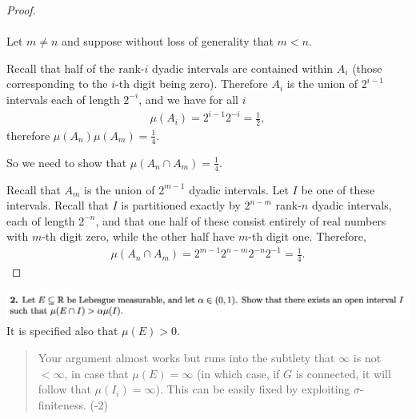 \begin{proof}~\\~\\
  Let $m \neq n$ and suppose without loss of generality that $m < n$.

  Recall that half of the rank-$i$ dyadic intervals are contained within $A_i$ (those corresponding to
  the $i$-th digit being zero). Therefore $A_i$ is the union of $2^{i-1}$ intervals each of length $2^{-i}$,
  and we have for all $i$
  \begin{align*}
     \mu(A_i) = 2^{i-1}2^{-i} =\frac{1}{2},
  \end{align*}
  therefore $\mu(A_n)\mu(A_m) = \frac{1}{4}$.

  So we need to show that $\mu(A_n \cap A_m) = \frac{1}{4}$.

  Recall that $A_m$ is the union of $2^{m-1}$ dyadic intervals. Let $I$ be one of these intervals. Recall
  that $I$ is partitioned exactly by $2^{n-m}$ rank-$n$ dyadic intervals, each of length $2^{-n}$, and that one
  half of these consist entirely of real numbers with $m$-th digit zero, while the other half have $m$-th digit
  one. Therefore,
  \begin{align*}
    \mu(A_n \cap A_m) = 2^{m-1}2^{n-m}2^{-n}2^{-1} = \frac{1}{4}.
  \end{align*}
\end{proof}
\newpage
\begin{mdframed}
\includegraphics[width=400pt]{img/analysis--berkeley-202a-hw05-2e34.png}\\
It is specified also that $\mu(E) > 0$.
\end{mdframed}

\begin{quote}
  Your argument almost works but runs into the subtlety that $\infty$ is not $< \infty$, in case
  that $\mu(E) = \infty$ (in which case, if $G$ is connected, it will follow that $\mu(I_i) = \infty$). This
  can be easily fixed by exploiting $\sigma$-finiteness. (-2)
\end{quote}

